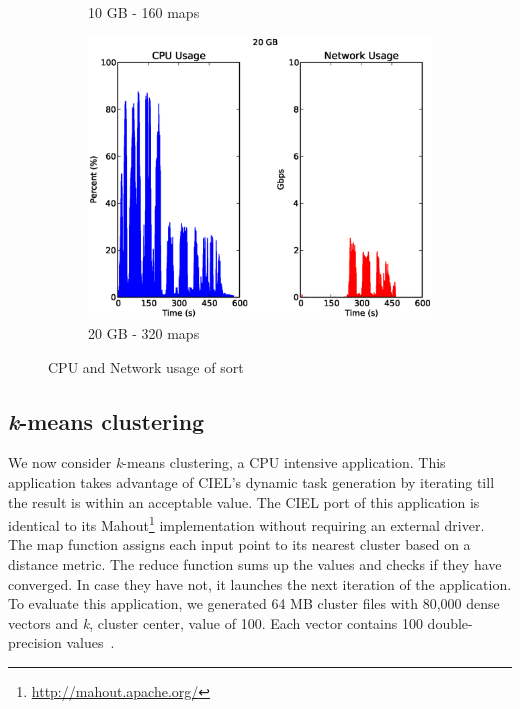 \documentclass[a4paper,12pt,twoside,openright]{report}
\begin{document}
\begin{figure}[h!]
\begin{subfigure}[b]{0.33\textwidth}
                \caption{10 GB - 160 maps}
                \label{fig:10GBsortres}
        \end{subfigure}
        \begin{subfigure}[b]{0.33\textwidth}
                \centering
                \includegraphics[width=\textwidth]{320maps.csv.eps}
                \caption{20 GB - 320 maps}
                \label{fig:20GBsortres}
        \end{subfigure}
        \caption{CPU and Network usage of sort}
        \label{chap:eval:sec:ciel:fig:sortres}
\end{figure}

\subsection{\emph{k}-means clustering}
We now consider \emph{k}-means clustering, a CPU intensive application. This
application takes advantage of CIEL's dynamic task generation by iterating till
the result is within an acceptable value. The CIEL port of this application is
identical to its Mahout\footnote{\url{http://mahout.apache.org/}} implementation
without requiring an external driver. The map function assigns each input point
to its nearest cluster based on a distance metric. The reduce function sums up
the values and checks if they have converged. In case they have not, it launches
the next iteration of the application. To evaluate this application, we
generated 64 MB cluster files with 80,000 dense vectors and \emph{k}, cluster
center, value of 100. Each vector contains 100 double-precision
values~\cite{Murray:2011:CUE}.
\end{document}
